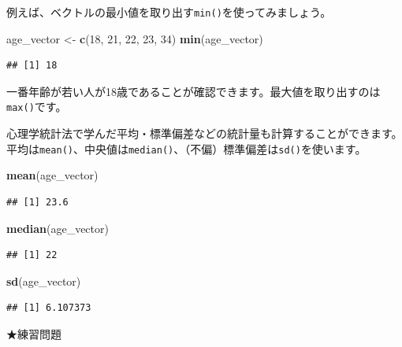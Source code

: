 \documentclass[]{book}
\newenvironment{Shaded}{\begin{snugshade}}{\end{snugshade}}
\newcommand{\KeywordTok}[1]{\textcolor[rgb]{0.13,0.29,0.53}{\textbf{#1}}}
\newcommand{\DecValTok}[1]{\textcolor[rgb]{0.00,0.00,0.81}{#1}}
\newcommand{\StringTok}[1]{\textcolor[rgb]{0.31,0.60,0.02}{#1}}
\newcommand{\NormalTok}[1]{#1}
\begin{document}
例えば、ベクトルの最小値を取り出す\texttt{min()}を使ってみましょう。

\begin{Shaded}
\begin{Highlighting}[]
\NormalTok{age_vector <-}\StringTok{ }\KeywordTok{c}\NormalTok{(}\DecValTok{18}\NormalTok{, }\DecValTok{21}\NormalTok{, }\DecValTok{22}\NormalTok{, }\DecValTok{23}\NormalTok{, }\DecValTok{34}\NormalTok{)}
\KeywordTok{min}\NormalTok{(age_vector)}
\end{Highlighting}
\end{Shaded}

\begin{verbatim}
## [1] 18
\end{verbatim}

一番年齢が若い人が18歳であることが確認できます。最大値を取り出すのは\texttt{max()}です。

心理学統計法で学んだ平均・標準偏差などの統計量も計算することができます。平均は\texttt{mean()}、中央値は\texttt{median()}、（不偏）標準偏差は\texttt{sd()}を使います。

\begin{Shaded}
\begin{Highlighting}[]
\KeywordTok{mean}\NormalTok{(age_vector)}
\end{Highlighting}
\end{Shaded}

\begin{verbatim}
## [1] 23.6
\end{verbatim}

\begin{Shaded}
\begin{Highlighting}[]
\KeywordTok{median}\NormalTok{(age_vector)}
\end{Highlighting}
\end{Shaded}

\begin{verbatim}
## [1] 22
\end{verbatim}

\begin{Shaded}
\begin{Highlighting}[]
\KeywordTok{sd}\NormalTok{(age_vector)}
\end{Highlighting}
\end{Shaded}

\begin{verbatim}
## [1] 6.107373
\end{verbatim}

★練習問題
\end{document}

